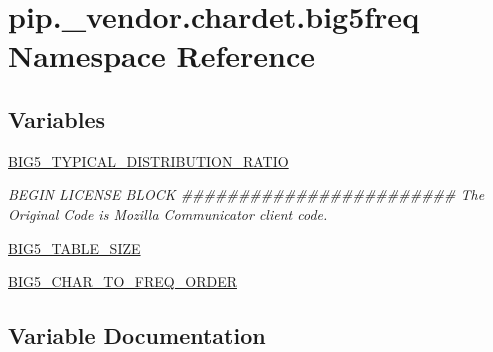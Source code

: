 \hypertarget{namespacepip_1_1__vendor_1_1chardet_1_1big5freq}{}\section{pip.\+\_\+vendor.\+chardet.\+big5freq Namespace Reference}
\label{namespacepip_1_1__vendor_1_1chardet_1_1big5freq}
\subsection*{Variables}
\begin{DoxyCompactItemize}
\item 
\hyperlink{namespacepip_1_1__vendor_1_1chardet_1_1big5freq_a46f3fd358432e04f9f27256946ae6bc4}{B\+I\+G5\+\_\+\+T\+Y\+P\+I\+C\+A\+L\+\_\+\+D\+I\+S\+T\+R\+I\+B\+U\+T\+I\+O\+N\+\_\+\+R\+A\+T\+IO}
\begin{DoxyCompactList}\small\item\em B\+E\+G\+IN L\+I\+C\+E\+N\+SE B\+L\+O\+CK \#\#\#\#\#\#\#\#\#\#\#\#\#\#\#\#\#\#\#\#\#\#\#\# The Original Code is Mozilla Communicator client code. \end{DoxyCompactList}\item 
\hyperlink{namespacepip_1_1__vendor_1_1chardet_1_1big5freq_a4ad4d8fe0ed4eaa346bc4543b412caf5}{B\+I\+G5\+\_\+\+T\+A\+B\+L\+E\+\_\+\+S\+I\+ZE}
\item 
\hyperlink{namespacepip_1_1__vendor_1_1chardet_1_1big5freq_ab8c5f620249544aebad76eed7cd1360a}{B\+I\+G5\+\_\+\+C\+H\+A\+R\+\_\+\+T\+O\+\_\+\+F\+R\+E\+Q\+\_\+\+O\+R\+D\+ER}
\end{DoxyCompactItemize}


\subsection{Variable Documentation}
\mbox{\label{namespacepip_1_1__vendor_1_1chardet_1_1big5freq_ab8c5f620249544aebad76eed7cd1360a}} 
